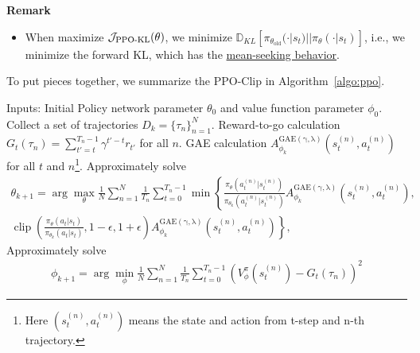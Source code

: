 \textbf{Remark}
\begin{itemize}
    \item When maximize ${\cal J}_{\text{PPO-KL}}(\theta)$, we minimize $\mathbb{D}_{K L}\left[\pi_{\theta_{\text{old}}}(\cdot|s_t)| | \pi_{\theta}(\cdot|s_t)\right]$, i.e., we minimize the forward KL, which has the \href{https://www.tuananhle.co.uk/notes/reverse-forward-kl.html}{mean-seeking behavior}.
\end{itemize}



To put pieces together, we summarize the PPO-Clip in Algorithm~\ref{algo:ppo}.
\begin{algorithm}[H]
\caption{PPO-Clip Algorithm}
\begin{algorithmic}[1]
    \State Inputs: Initial Policy network parameter $\theta_0$ and value function parameter $\phi_0$.
        \State Collect a set of trajectories $D_k=\{\tau_n\}_{n=1}^{N}$.
        \State Reward-to-go calculation $G_t(\tau_n) = \sum_{t'=t}^{T_n-1}\gamma^{t'-t}r_{t'}$ for all $n$.
         \State GAE calculation $A^{\operatorname{GAE(\gamma,\lambda)}}_{\phi_k}(s_t^{(n)},a_t^{(n)})$ for all $t$ and $n$\footnote{Here $(s_t^{(n)},a_t^{(n)})$ means the state and action from t-step and n-th trajectory.}. 
        \State Approximately solve 
            \begin{align*}
                 \theta_{k+1}=\arg\max_{\theta} \frac{1}{N}\sum_{n=1}^{N}\frac{1}{T_n}
                  \sum_{t=0}^{T_n-1}  
                 \min\left\{\frac{\pi_{\theta}(a_t^{(n)}|s_t^{(n)})}{\pi_{\theta_{k}}(a_t^{(n)}|s_t^{(n)})}A^{\operatorname{GAE(\gamma,\lambda)}}_{\phi_k}(s_t^{(n)},a_t^{(n)}),  \right.
                 \\
                 \left.\operatorname{clip}\left(\frac{\pi_{\theta}(a_t|s_t)}{\pi_{\theta_{k}}(a_t|s_t)}, 1-\epsilon, 1+\epsilon\right)
                 A^{\operatorname{GAE(\gamma,\lambda)}}_{\phi_k}(s_t^{(n)},a_t^{(n)})\right\},
            \end{align*}
        \State Approximately solve 
            \begin{align*}
                \phi_{k+1}=\arg\min_{\phi} \frac{1}{N}\sum_{n=1}^{N}\frac{1}{T_n}
                  \sum_{t=0}^{T_n-1}(V^{\pi}_{\phi}(s_t^{(n)}) - G_t(\tau_n))^2
            \end{align*}
    \EndFor
\end{algorithmic}
\label{algo:ppo}
\end{algorithm}

